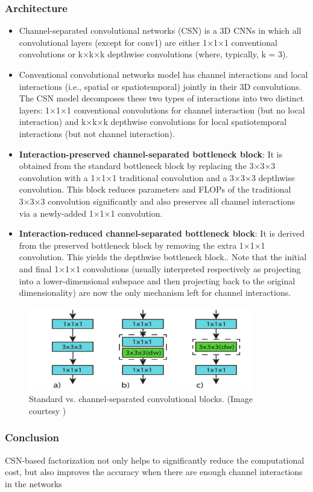 \subsubsection{Architecture}
\begin{itemize}
    \item Channel-separated convolutional networks (CSN) is a 3D CNNs in which all convolutional layers (except for conv1) are either 1×1×1 conventional convolutions or k×k×k depthwise convolutions (where, typically, k = 3).
    \item Conventional convolutional networks model has channel interactions and local interactions (i.e., spatial or spatiotemporal) jointly in their 3D convolutions. The CSN model decomposes these two types of interactions into two distinct layers: 1×1×1 conventional convolutions for channel interaction (but no local interaction) and k×k×k depthwise convolutions for local spatiotemporal interactions (but not channel interaction).
    \item \textbf{Interaction-preserved channel-separated bottleneck block}: It is obtained from the standard bottleneck block by replacing the 3×3×3 convolution with a 1×1×1 traditional convolution and a 3×3×3 depthwise convolution. This block reduces parameters and FLOPs of the traditional 3×3×3 convolution significantly and also  preserves all channel interactions via a newly-added 1×1×1 convolution. 
    \item \textbf{Interaction-reduced channel-separated bottleneck block}: It is derived from the preserved bottleneck block by removing the extra 1×1×1 convolution. This yields the depthwise bottleneck block.. Note that the initial and final 1×1×1 convolutions (usually interpreted respectively as projecting into a lower-dimensional subspace and then projecting back to the original dimensionality) are now the only mechanism left for channel interactions.
\end{itemize}
\begin{figure}[H]
	\includegraphics[width=\linewidth]{assets/img/csn_2.png}
	\caption{Standard vs. channel-separated convolutional blocks. (Image courtesy \cite{csn})}
\end{figure}

\subsubsection{Conclusion}
\par CSN-based factorization not only helps to significantly reduce the computational cost, but also improves the accuracy when there are enough channel interactions in the networks